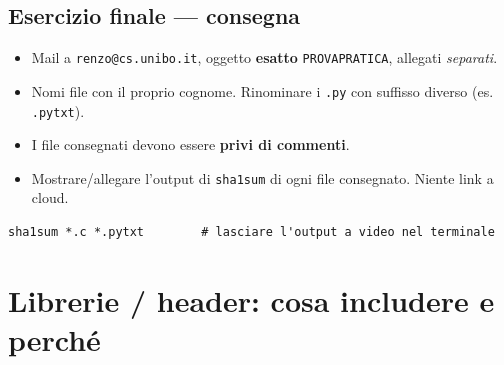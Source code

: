 \documentclass[10pt,a4paper]{article}
\begin{document}
\subsection{Esercizio finale --- consegna}
\begin{itemize}
\item Mail a \texttt{renzo@cs.unibo.it}, oggetto \textbf{esatto} \texttt{PROVAPRATICA}, allegati \emph{separati}.
\item Nomi file con il proprio cognome. Rinominare i \verb|.py| con suffisso diverso (es. \verb|.pytxt|).
\item I file consegnati devono essere \textbf{privi di commenti}.
\item Mostrare/allegare l'output di \verb|sha1sum| di ogni file consegnato. Niente link a cloud.
\end{itemize}
\begin{lstlisting}[style=base]
sha1sum *.c *.pytxt        # lasciare l'output a video nel terminale
\end{lstlisting}

\section{Librerie / header: cosa includere e perché}
\end{document}
